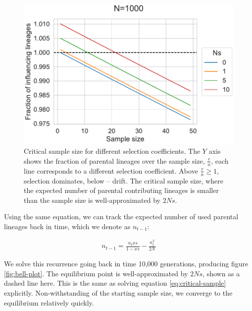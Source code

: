 \documentclass[review]{elsarticle}
\begin{document}
\begin{figure}
  \centering
  \includegraphics{fig/critical_sample_size.pdf}
  \caption{Critical sample size for different selection coefficients. The $Y$ axis shows the
    fraction of parental lineages over the sample size, $\frac{r}{n}$, each line corresponds to a
    different selection coefficient. Above $\frac{r}{n}\ge 1$, selection dominates, below -- drift.
    The critical sample size, where the expected number of parental contributing lineages is smaller
    than the sample size is well-approximated by $2Ns$.}
  \label{fig:critical-sample-size}
\end{figure}


Using the same equation, we can track the expected number of used parental lineages back in time,
which we denote as $n_{t-1}$:

\begin{align}
  \label{eq:contributors-back}
  n_{t-1}=\frac{n_txs}{1-xs} - \frac{n_t^2}{2N}
\end{align}

We solve this recurrence going back in time 10,000 generations, producing figure
\ref{fig:bell-plot}. The equilibrium point is well-approximated by $2Ns$, shown as a dashed line
here. This is the same as solving equation \ref{eq:critical-sample} explicitly. Non-withstanding of
the starting sample size, we converge to the equilibrium relatively quickly.
\end{document}
